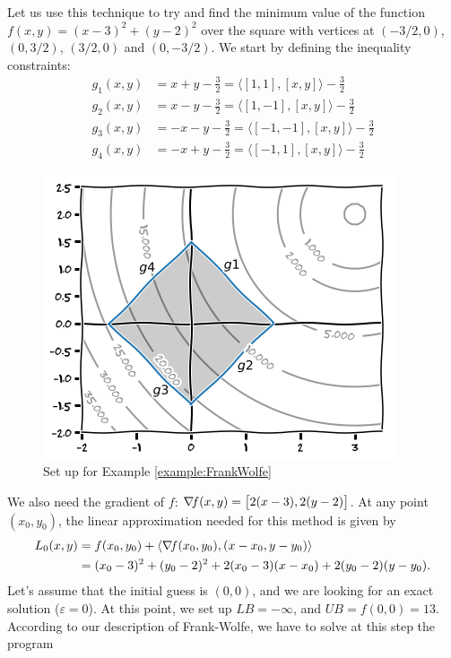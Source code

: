 \begin{example}\label{example:FrankWolfe}
Let us use this technique to try and find the minimum value of the function $f(x,y)=(x-3)^2+(y-2)^2$ over the square with vertices at $(-3/2, 0)$, $(0, 3/2)$, $(3/2, 0)$ and $(0, -3/2)$. We start by defining the inequality constraints:
\begin{align*}
g_1(x,y) &= x+y-\tfrac{3}{2} = \langle [1,1], [x,y] \rangle - \tfrac{3}{2} \\
g_2(x,y) &= x-y-\tfrac{3}{2} = \langle [1,-1], [x,y] \rangle - \tfrac{3}{2} \\
g_3(x,y) &= -x-y-\tfrac{3}{2} = \langle [-1,-1], [x,y] \rangle - \tfrac{3}{2} \\
g_4(x,y) &= -x+y-\tfrac{3}{2} = \langle [-1,1], [x,y] \rangle - \tfrac{3}{2}
\end{align*}
\begin{figure}[ht!]
\includegraphics[width=0.75\linewidth]{images/frankwolfesetup.png}
\caption{Set up for Example \ref{example:FrankWolfe}}\label{figure:FrankWolfesetup}
\end{figure}
We also need the gradient of $f$: $\mathop{\nabla\! {f}}(x,y) = \big[ 2(x-3), 2(y-2) \big]$. At any point $(x_0,y_0)$, the linear approximation needed for this method is given by
\begin{align*}
L_0(x,y) &= f(x_0,y_0) + \langle \mathop{\nabla\! {f}}(x_0, y_0), (x-x_0,y-y_0) \rangle \\
&= (x_0-3)^2 + (y_0-2)^2 + 2(x_0-3)(x-x_0) + 2(y_0-2)(y-y_0).
\end{align*}
Let's assume that the initial guess is $(0,0)$, and we are looking for an exact solution ($\varepsilon=0$).  At this point, we set up $LB=-\infty$, and $UB=f(0,0)=13$.  According to our description of Frank-Wolfe, we have to solve at this step the program

\end{example}
